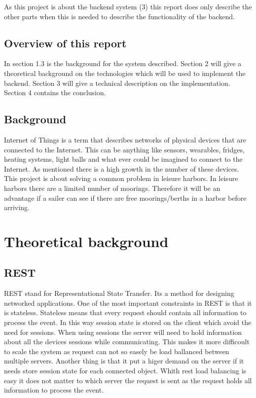 \documentclass[a4paper,12pt,english]{article}
\begin{document}
As this project is about the backend system (3) this report does only
describe the other parts when this is needed to describe the functionality of
the backend.

\subsection{Overview of this report}
In section 1.3 is the background for the system described. Section 2 will give a
theoretical background on the technologies which will be used
to implement the backend. Section 3 will give a technical description on the
implementation. Section 4 contains the conclusion.

\subsection{Background}
Internet of Things is a term that describes networks of physical devices that
are connected to the Internet. This can be anything like sensors, wearables,
fridges, heating systems, light balls and what ever could be imagined to
connect to the Internet.
As mentioned there is a high growth in the number of these devices.
This project is about solving a common problem in leisure harbors. 
In leisure harbors there are a limited number of moorings. Therefore it will be
an advantage if a sailer can see if there are free moorings/berths in a harbor
before arriving. 

\section{Theoretical background}
\subsection{REST}
REST stand for Representational State Transfer. Its a method for designing
networked applications.
One of the most important constraints in REST is that it is stateless. Stateless
means that every request should contain all information to process the event. In this
way session state is stored on the client which avoid the need for sessions.
When using sessions the server will need to hold information
about all the devices sessions while communicating. This makes it more difficoult to scale the system
as request can not so easely be load ballanced between multiple servers. Another
thing is that it put a higer demand on the server if it needs store session
state for each connected object. Whith rest load balancing is easy it does not
matter to which server the request is sent as the request holds all information to process the event.
\end{document}
